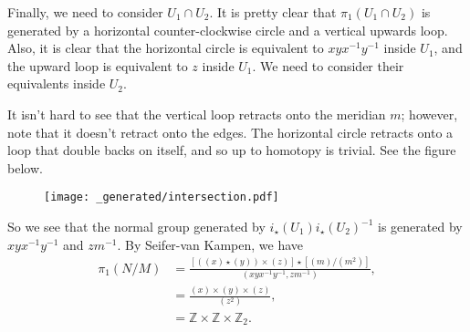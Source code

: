 Finally, we need to consider \(U_1 \cap U_2\). It is pretty clear that \(\pi_1(U_1 \cap U_2)\) is generated by
a horizontal counter-clockwise circle and a vertical upwards loop. Also, it is clear that the horizontal 
circle is equivalent to \(xyx^{-1}y^{-1}\) inside \(U_1\), and the upward loop is equivalent to \(z\) inside
\(U_1\). We need to consider their equivalents inside \(U_2\). 

It isn't hard to see that the vertical loop retracts onto the meridian \(m\); however, note that it doesn't
retract onto the edges. The horizontal circle retracts onto a loop that double backs on itself, and so up to
homotopy is trivial. See the figure below. 

\begin{figure}[H]
\centering
\texttt{[image: \_generated/intersection.pdf]}
\end{figure}

So we see that the normal group generated by \(i_\star(U_1) i_\star(U_2)^{-1}\) is generated by
\(xyx^{-1}y^{-1}\) and \(zm^{-1}\). By Seifer-van Kampen, we have
\begin{align}
\pi_1(N / M) & = \frac{ [((x)\star (y))\times (z)] \star [(m) / (m^2)]} {(xyx^{-1}y^{-1}, zm^{-1}) }, \\
    & = \frac{(x)\times(y)\times(z)}{(z^2)}, \\
    & = \mathbb Z \times \mathbb Z \times \mathbb Z_2. 
\end{align}
